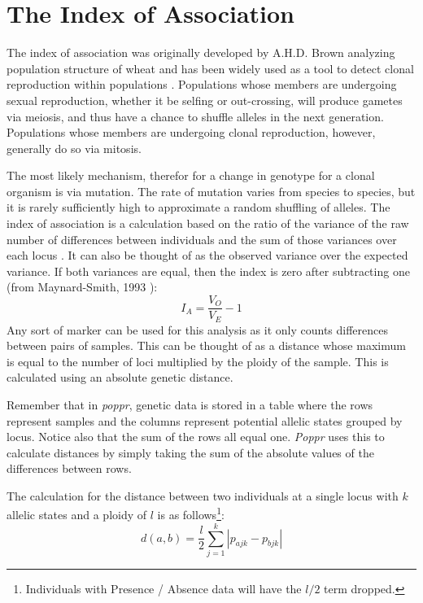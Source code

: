 \documentclass[letterpaper]{article}\usepackage[]{graphicx}\usepackage[]{color}
\newcommand{\poppr}{\textit{poppr}}
\newcommand{\Poppr}{\textit{Poppr}}
\begin{document}
\section{The Index of Association}
\label{indexassoc}

The index of association was originally developed by A.H.D. Brown analyzing
population structure of wheat and has been widely used as a tool to detect
clonal reproduction within populations \cite{Brown:1980, Smith:1993}.
Populations whose members are undergoing sexual reproduction, whether it be
selfing or out-crossing, will produce gametes via meiosis, and thus have a
chance to shuffle alleles in the next generation. Populations whose members are
undergoing clonal reproduction, however, generally do so via mitosis.

The most likely mechanism, therefor for a change in genotype for a clonal organism is via
mutation. The rate of mutation varies from species to species, but it is rarely
sufficiently high to approximate a random shuffling of alleles. The index of
association is a calculation based on the ratio of the variance of the raw
number of differences between individuals and the sum of those variances over
each locus \cite{Smith:1993}. It can also be thought of as the observed variance
over the expected variance. If both variances are equal, then the index is zero
after subtracting one (from Maynard-Smith, 1993 \cite{Smith:1993}):
\begin{equation}
\label{eq:I_A}
I_A = \frac{V_O}{V_E}-1
\end{equation}
Any sort of marker can be used for this analysis as it only counts differences
between pairs of samples. This can be thought of as a distance whose maximum is
equal to the number of loci multiplied by the ploidy of the sample. This is
calculated using an absolute genetic distance.

Remember that in \poppr{}, genetic data is stored in a table where the rows
represent samples and the columns represent potential allelic states grouped by
locus. Notice also that the sum of the rows all equal one. \Poppr{} uses this to
calculate distances by simply taking the sum of the absolute values of the
differences between rows.

The calculation for the distance between two individuals at a single locus with
$k$ allelic states and a ploidy of $l$ is as follows\footnote{Individuals with
Presence / Absence data will have the $l/2$ term dropped.}:
\begin{equation}
\label{eq:ia_d}
  d(a,b)=\frac{l}{2} \sum_{j=1}^{k}
  |p_{ajk} - p_{bjk}|
\end{equation}
\end{document}
